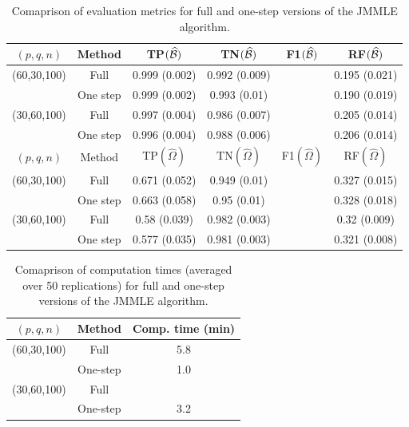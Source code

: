 \begin{table}
\centering
    \begin{tabular}{cccccc}
    \hline
    $(p,q,n)$     & Method         & TP$(\widehat {{\cal{B}}})$            & TN$(\widehat {{\cal{B}}})$            & F1$(\widehat {{\cal{B}}})$ & RF$(\widehat {{\cal{B}}})$             \\\hline
    (60,30,100) & Full         & 0.999 (0.002) & 0.992 (0.009) & ~   & 0.195 (0.021)                \\
    ~           & One step     & 0.999 (0.002) &  0.993 (0.01) & ~   & 0.190 (0.019)                 \\
    (30,60,100) & Full          & 0.997 (0.004) & 0.986 (0.007) & ~   & 0.205 (0.014)               \\
    ~           & One step & 0.996 (0.004) & 0.988 (0.006) & ~   & 0.206 (0.014)             \\ \hline
    \hline
    $(p,q,n)$     & Method         & TP$(\widehat \Omega)$            & TN$(\widehat \Omega)$            & F1$(\widehat \Omega)$ & RF$(\widehat \Omega)$            \\\hline
    (60,30,100) & Full         & 0.671 (0.052) & 0.949 (0.01) & ~   & 0.327 (0.015)                \\
    ~           & One step     & 0.663 (0.058) & 0.95 (0.01)   & ~   & 0.328 (0.018)               \\
    (30,60,100) & Full          & 0.58 (0.039) & 0.982 (0.003) & ~   & 0.32 (0.009)             \\
    ~           & One step & 0.577 (0.035) & 0.981 (0.003)  & ~   & 0.321 (0.008)            \\ \hline
    \end{tabular}
    \caption{Comaprison of evaluation metrics for full and one-step versions of the JMMLE algorithm.}
    \label{table:simtable41}
\end{table}

\begin{table}[t]
\centering
  \begin{tabular}{ccc}
    \hline
    $(p,q,n)$     & Method   & Comp. time (min) \\ \hline
    (60,30,100) & Full     & 5.8              \\ 
    ~           & One-step & 1.0              \\ \hline
    (30,60,100) & Full     & ~             \\ 
    ~           & One-step & 3.2              \\ \hline
    \end{tabular}
    \caption{Comaprison of computation times (averaged over 50 replications) for full and one-step versions of the JMMLE algorithm.}
    \label{table:simtable42}
\end{table}



